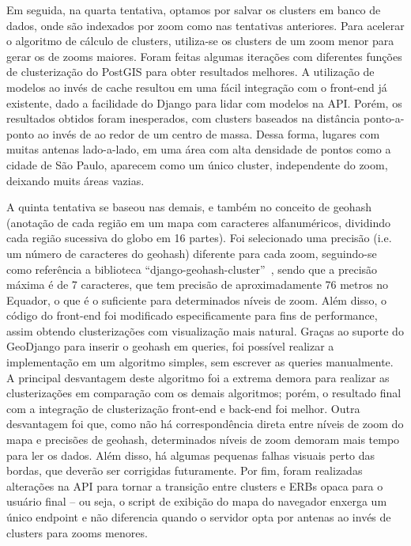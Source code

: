 \documentclass[]{politex}
\begin{document}
Em seguida, na quarta tentativa, optamos por salvar os clusters em banco de
dados, onde são indexados por zoom como nas tentativas anteriores. Para acelerar
o algoritmo de cálculo de clusters, utiliza-se os clusters de um zoom menor para
gerar os de zooms maiores. Foram feitas algumas iterações com diferentes funções
de clusterização do PostGIS para obter resultados melhores. A utilização de
modelos ao invés de cache resultou em uma fácil integração com o front-end já
existente, dado a facilidade do Django para lidar com modelos na API. Porém,
os resultados obtidos foram inesperados, com clusters baseados na distância
ponto-a-ponto ao invés de ao redor de um centro de massa. Dessa forma, lugares
com muitas antenas lado-a-lado, em uma área com alta densidade de pontos como a
cidade de São Paulo, aparecem como um único cluster, independente do zoom,
deixando muits áreas vazias.

A quinta tentativa se baseou nas demais, e também no conceito de geohash
(anotação de cada região em um mapa com caracteres alfanuméricos, dividindo cada
região sucessiva do globo em 16 partes). Foi selecionado uma precisão (i.e. um
número de caracteres do geohash) diferente para cada zoom, seguindo-se como
referência a biblioteca  ``django-geohash-cluster''~\cite{geohashcluster}, sendo
que a precisão máxima é de 7 caracteres, que tem precisão de aproximadamente 76
metros no Equador, o que é o suficiente para determinados níveis de zoom.
Além disso, o código do front-end foi modificado especificamente para fins de
performance, assim obtendo clusterizações com visualização mais natural.
Graças ao suporte do GeoDjango para inserir o geohash em queries, foi possível
realizar a implementação em um algoritmo simples, sem escrever as queries
manualmente. A principal desvantagem deste algoritmo foi a extrema demora para
realizar as clusterizações em comparação com os demais algoritmos; porém, o
resultado final com a integração de clusterização front-end e back-end foi
melhor. Outra desvantagem foi que, como não há correspondência direta entre
níveis de zoom do mapa e precisões de geohash, determinados níveis de zoom
demoram mais tempo para ler os dados. Além disso, há algumas pequenas falhas
visuais perto das bordas, que deverão ser corrigidas futuramente. Por fim,
foram realizadas alterações na API para tornar a transição entre clusters e
ERBs opaca para o usuário final -- ou seja, o script de exibição do mapa do
navegador enxerga um único endpoint e não diferencia quando o servidor opta por
antenas ao invés de clusters para zooms menores.
\end{document}

